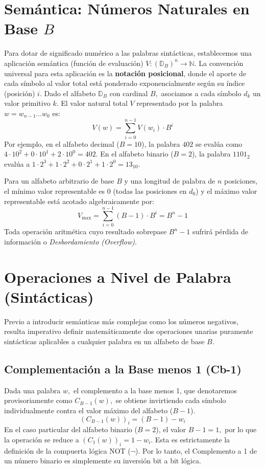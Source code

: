 \section{Semántica: Números Naturales en Base $B$}

Para dotar de significado numérico a las palabras sintácticas, establecemos una aplicación semántica (función de evaluación) $V: (\mathbb{D}_B)^n \to \mathbb{N}.$
La convención universal para esta aplicación es la \textbf{notación posicional}, donde el aporte de cada símbolo al valor total está ponderado exponencialmente según su índice (posición) $i.$
Dado el alfabeto $\mathbb{D}_B$ con cardinal $B,$ asociamos a cada símbolo $d_k$ un valor primitivo $k.$
El valor natural total $V$ representado por la palabra $w = w_{n-1} \dots w_0$ es:
\[ V(w) = \sum_{i=0}^{n-1} V(w_i) \cdot B^i \]
Por ejemplo, en el alfabeto decimal ($B=10$), la palabra $402$ se evalúa como $4 \cdot 10^2 + 0 \cdot 10^1 + 2 \cdot 10^0 = 402.$ En el alfabeto binario ($B=2$), la palabra $1101_2$ evalúa a $1 \cdot 2^3 + 1 \cdot 2^2 + 0 \cdot 2^1 + 1 \cdot 2^0 = 13_{10}.$

Para un alfabeto arbitrario de base $B$ y una longitud de palabra de $n$ posiciones, el mínimo valor representable es $0$ (todas las posiciones en $d_0$) y el máximo valor representable está acotado algebraicamente por:
\[ V_{\max} = \sum_{i=0}^{n-1} (B-1) \cdot B^i = B^n - 1 \]
Toda operación aritmética cuyo resultado sobrepase $B^n - 1$ sufrirá pérdida de información o \textit{Desbordamiento (Overflow)}.

\section{Operaciones a Nivel de Palabra (Sintácticas)}

Previo a introducir semánticas más complejas como los números negativos, resulta imperativo definir matemáticamente dos operaciones unarias puramente sintácticas aplicables a cualquier palabra en un alfabeto de base $B.$

\subsection{Complementación a la Base menos 1 (Cb-1)}
Dada una palabra $w,$ el complemento a la base menos 1, que denotaremos provisoriamente como $C_{B-1}(w),$ se obtiene invirtiendo cada símbolo individualmente contra el valor máximo del alfabeto ($B-1$). 
\[ (C_{B-1}(w))_i = (B - 1) - w_i \]
En el caso particular del alfabeto binario ($B=2$), el valor $B-1 = 1,$ por lo que la operación se reduce a $(C_1(w))_i = 1 - w_i.$ Esta es estrictamente la definición de la compuerta lógica NOT ($\neg$). Por lo tanto, el Complemento a 1 de un número binario es simplemente su inversión bit a bit lógica.

